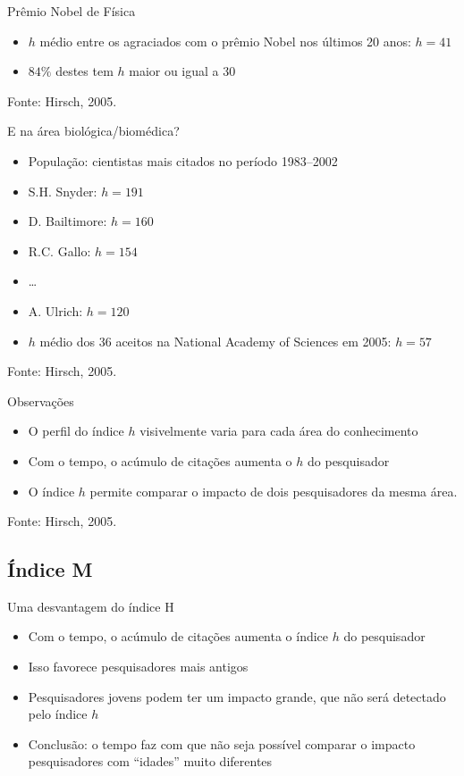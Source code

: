 \documentclass{beamer}
\begin{document}
\begin{frame}{Prêmio Nobel de Física}
  \begin{itemize}
  \item $h$ médio entre os agraciados com o prêmio Nobel nos últimos 20 anos: $h=41$
  \item $84\%$ destes tem $h$ maior ou igual a 30
  \end{itemize}

\vfill
Fonte: Hirsch, 2005.
\end{frame}

\begin{frame}{E na área biológica/biomédica?}
  \begin{itemize}
  \item População: cientistas mais citados no período 1983--2002
  \item<1-> S.H. Snyder: $h=191$
  \item<1-> D. Bailtimore: $h=160$
  \item<1-> R.C. Gallo: $h=154$
  \item<1-> \ldots
  \item<1-> A. Ulrich: $h=120$
  \item<2-> $h$ médio dos 36 aceitos na National Academy of Sciences em 2005: $h=57$
  \end{itemize}

\vfill
Fonte: Hirsch, 2005.
\end{frame}

\begin{frame}{Observações}
  \begin{itemize}
  \item O perfil do índice $h$ visivelmente varia para cada área do conhecimento
  \item Com o tempo, o acúmulo de citações aumenta o $h$ do pesquisador
  \item O índice $h$ permite comparar o impacto de dois pesquisadores da mesma área.
  \end{itemize}

\vfill
Fonte: Hirsch, 2005.
\end{frame}

\subsection{Índice M}

\begin{frame}{Uma desvantagem do índice H}
  \begin{itemize}
  \item Com o tempo, o acúmulo de citações aumenta o índice $h$ do pesquisador
  \item Isso favorece pesquisadores mais antigos
  \item Pesquisadores jovens podem ter um impacto grande, que não será detectado pelo índice $h$
  \item Conclusão: o tempo faz com que não seja possível comparar o impacto pesquisadores com ``idades'' muito diferentes
  \end{itemize}
\end{frame}
\end{document}
